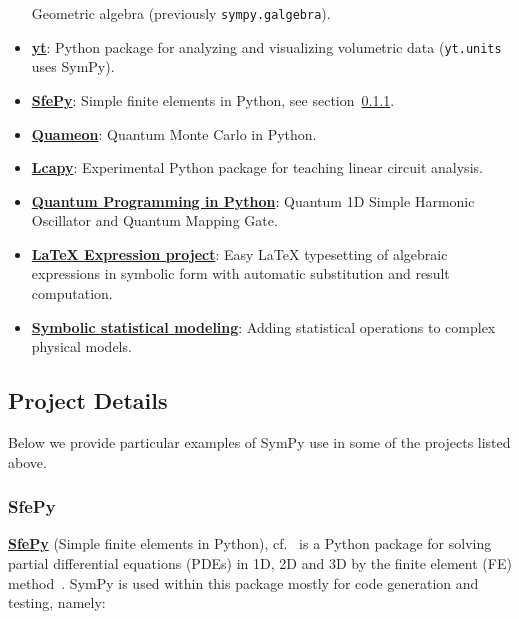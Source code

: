 \begin{itemize}
  Geometric algebra (previously \texttt{sympy.galgebra}).
\item
  \href{http://yt-project.org/}{\textbf{yt}}: Python package for
  analyzing and visualizing volumetric data (\texttt{yt.units} uses SymPy).
\item
  \href{http://sfepy.org/}{\textbf{SfePy}}: Simple finite elements in
  Python, see section~\ref{sfepy}.
\item
  \href{http://quameon.sourceforge.net/}{\textbf{Quameon}}: Quantum
  Monte Carlo in Python.
\item
  \href{http://lcapy.elec.canterbury.ac.nz/}{\textbf{Lcapy}}:
  Experimental Python package for teaching linear circuit analysis.
\item
  \href{http://digitalcommons.calpoly.edu/cgi/viewcontent.cgi?article=1072\&context=physsp/}{\textbf{Quantum
  Programming in Python}}: Quantum 1D Simple Harmonic Oscillator and
  Quantum Mapping Gate.
\item
  \href{http://mech.fsv.cvut.cz/~stransky/software/latexexpr/doc/}{\textbf{LaTeX
  Expression project}}: Easy \LaTeX{} typesetting of algebraic expressions
  in symbolic form with automatic substitution and result computation.
\item
  \href{https://www.researchgate.net/publication/260585491_Symbolic_Statistics_with_SymPy/}{\textbf{Symbolic
  statistical modeling}}: Adding statistical operations to complex
  physical models.
\end{itemize}

\subsection{Project Details}\label{projects-details}

Below we provide particular examples of SymPy use in some of the projects
listed above.

\subsubsection{SfePy}\label{sfepy}

\href{http://sfepy.org/}{\textbf{SfePy}} (Simple finite elements in Python),
cf.~\cite{cimrman2014sfepy} is a Python package for solving partial
differential equations (PDEs) in 1D, 2D and 3D by the finite element (FE)
method~\cite{Zienkiewicz2013FEM}. SymPy is used within this package mostly for
code generation and testing, namely:

